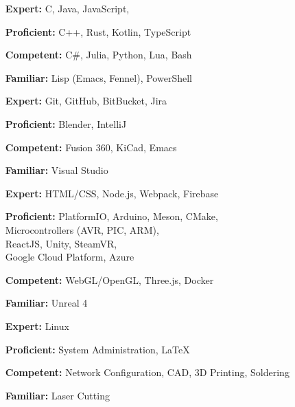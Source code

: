 \documentclass[9pt]{developercv} %
\begin{document}
\begin{minipage}[t]{0.45\textwidth}
	\begin{itemize}
		\item[\textbf{Expert:}] C, Java, JavaScript,
		\item[\textbf{Proficient:}] C++, Rust, Kotlin, TypeScript
		\item[\textbf{Competent:}] C\#, Julia, Python, Lua, Bash
		\item[\textbf{Familiar:}] Lisp (Emacs, Fennel), PowerShell
	\end{itemize}
\end{minipage}
\hfill
\begin{minipage}[t]{0.5\textwidth}
	\begin{itemize}
		\item[\textbf{Expert:}] Git, GitHub, BitBucket, Jira
		\item[\textbf{Proficient:}] Blender, IntelliJ
		\item[\textbf{Competent:}] Fusion 360, KiCad, Emacs
		\item[\textbf{Familiar:}] Visual Studio
	\end{itemize}
\end{minipage}

\vspace{1em}

\begin{minipage}[t]{0.45\textwidth}
	\begin{itemize}
		\item[\textbf{Expert:}] HTML/CSS, Node.js, Webpack, Firebase
		\item[\textbf{Proficient:}] PlatformIO, Arduino, Meson, CMake, \\
			Microcontrollers (AVR, PIC, ARM),  \\
			ReactJS, Unity, SteamVR, \\
			Google Cloud Platform, Azure
		\item[\textbf{Competent:}] WebGL/OpenGL, Three.js, Docker
		\item[\textbf{Familiar:}] Unreal 4
	\end{itemize}
\end{minipage}
\hfill
\begin{minipage}[t]{0.5\textwidth} %
	\begin{itemize}
		\item[\textbf{Expert:}] Linux
		\item[\textbf{Proficient:}] System Administration, \LaTeX
		\item[\textbf{Competent:}] Network Configuration, CAD, 3D Printing, Soldering
		\item[\textbf{Familiar:}] Laser Cutting
	\end{itemize}
\end{minipage}
\end{document}
